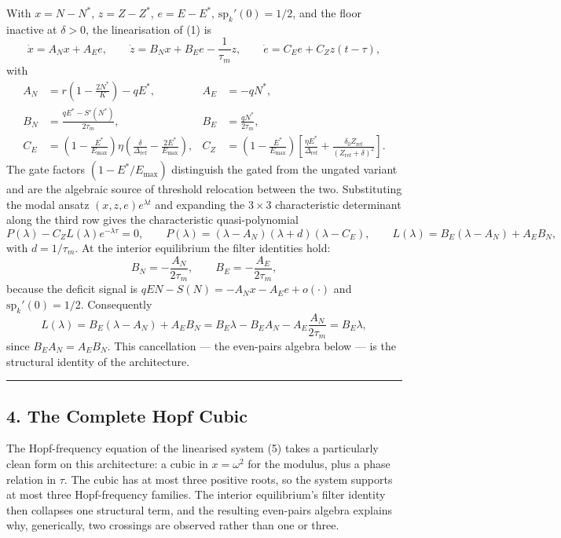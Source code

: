 \documentclass[11pt]{article}
\begin{document}
With \(x = N - N^*\), \(z = Z - Z^*\), \(e = E - E^*\),
\(\mathrm{sp}_k'(0) = 1/2\), and the floor inactive at \(\delta > 0\),
the linearisation of (1) is
\[\dot x = A_N x + A_E e, \qquad \dot z = B_N x + B_E e - \frac{1}{\tau_m}z, \qquad \dot e = C_E e + C_Z z(t - \tau),\]
with \[\begin{aligned}
A_N &= r\left(1 - \frac{2N^*}{K}\right) - qE^*, & A_E &= -qN^*, \\
B_N &= \frac{qE^* - S'(N^*)}{2\tau_m}, & B_E &= \frac{qN^*}{2\tau_m}, \\
C_E &= \left(1 - \frac{E^*}{E_{\max}}\right)\eta\left(\frac{\delta}{\Delta_{\mathrm{ref}}} - \frac{2E^*}{E_{\max}}\right), & C_Z &= \left(1 - \frac{E^*}{E_{\max}}\right)\left[\frac{\eta E^*}{\Delta_{\mathrm{ref}}} + \frac{\delta_0 Z_{\mathrm{ref}}}{(Z_{\mathrm{ref}} + \delta)^2}\right].
\end{aligned}\] The gate factors \((1 - E^*/E_{\max})\) distinguish the
gated from the ungated variant and are the algebraic source of threshold
relocation between the two. Substituting the modal ansatz
\((x,z,e)e^{\lambda t}\) and expanding the \(3 \times 3\) characteristic
determinant along the third row gives the characteristic
quasi-polynomial
\[P(\lambda) - C_Z L(\lambda) e^{-\lambda\tau} = 0, \qquad P(\lambda) = (\lambda - A_N)(\lambda + d)(\lambda - C_E), \qquad L(\lambda) = B_E(\lambda - A_N) + A_E B_N, \tag{5}\]
with \(d = 1/\tau_m\). At the interior equilibrium the filter identities
hold: \[B_N = -\frac{A_N}{2\tau_m}, \qquad B_E = -\frac{A_E}{2\tau_m},\]
because the deficit signal is \(qEN - S(N) = -A_N x - A_E e + o(\cdot)\)
and \(\mathrm{sp}_k'(0) = 1/2\). Consequently
\[L(\lambda) = B_E(\lambda - A_N) + A_E B_N = B_E\lambda - B_E A_N - A_E \frac{A_N}{2\tau_m} = B_E\lambda,\]
since \(B_E A_N = A_E B_N\). This cancellation --- the even-pairs
algebra below --- is the structural identity of the architecture.

\begin{center}\rule{0.5\linewidth}{0.5pt}\end{center}

\subsection{4. The Complete Hopf Cubic}\label{the-complete-hopf-cubic}

The Hopf-frequency equation of the linearised system (5) takes a
particularly clean form on this architecture: a cubic in
\(x = \omega^2\) for the modulus, plus a phase relation in \(\tau\). The
cubic has at most three positive roots, so the system supports at most
three Hopf-frequency families. The interior equilibrium's filter
identity then collapses one structural term, and the resulting
even-pairs algebra explains why, generically, two crossings are observed
rather than one or three.
\end{document}
